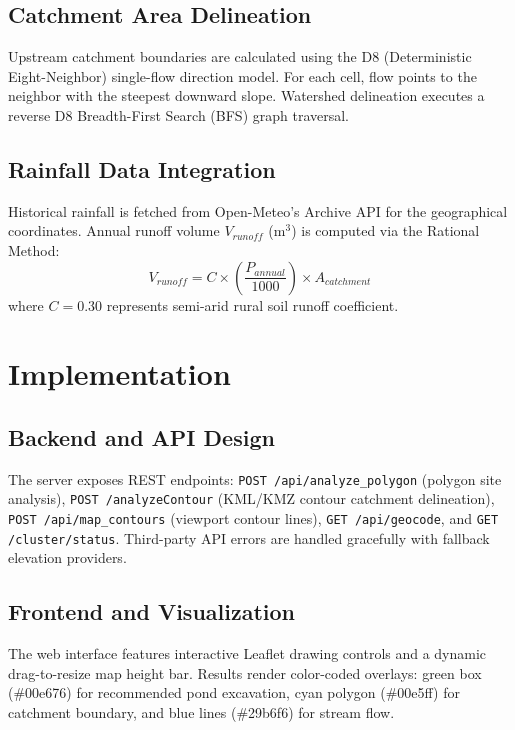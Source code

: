 \documentclass[manuscript,screen,review]{acmart}
\begin{document}
\subsection{Catchment Area Delineation}
Upstream catchment boundaries are calculated using the D8 (Deterministic Eight-Neighbor) single-flow direction model. For each cell, flow points to the neighbor with the steepest downward slope. Watershed delineation executes a reverse D8 Breadth-First Search (BFS) graph traversal.

\subsection{Rainfall Data Integration}
Historical rainfall is fetched from Open-Meteo's Archive API for the geographical coordinates. Annual runoff volume $V_{runoff}$ ($\text{m}^3$) is computed via the Rational Method:
\begin{equation}
V_{runoff} = C \times \left(\frac{P_{annual}}{1000}\right) \times A_{catchment}
\end{equation}
where $C = 0.30$ represents semi-arid rural soil runoff coefficient.

\section{Implementation}
\label{sec:implementation}

\subsection{Backend and API Design}
The server exposes REST endpoints: \texttt{POST /api/analyze\_polygon} (polygon site analysis), \texttt{POST /analyzeContour} (KML/KMZ contour catchment delineation), \texttt{POST /api/map\_contours} (viewport contour lines), \texttt{GET /api/geocode}, and \texttt{GET /cluster/status}. Third-party API errors are handled gracefully with fallback elevation providers.

\subsection{Frontend and Visualization}
The web interface features interactive Leaflet drawing controls and a dynamic drag-to-resize map height bar. Results render color-coded overlays: green box (\#00e676) for recommended pond excavation, cyan polygon (\#00e5ff) for catchment boundary, and blue lines (\#29b6f6) for stream flow.
\end{document}
